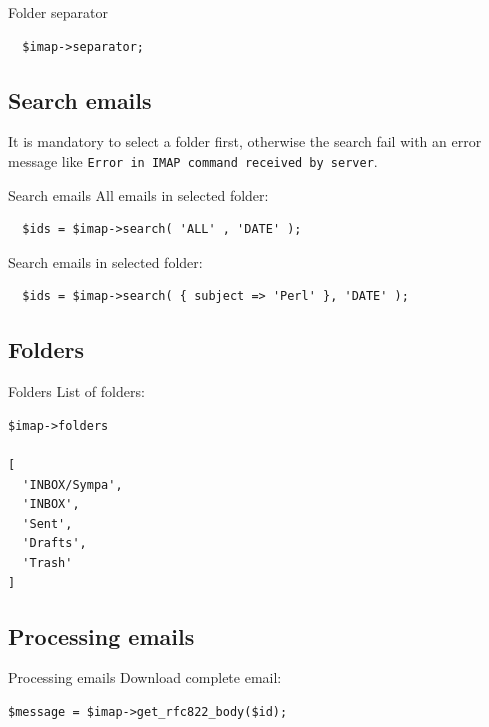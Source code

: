 \begin{frame}[fragile]{Folder separator}

\begin{verbatim}
  $imap->separator;
\end{verbatim}

\end{frame}

\subsection{Search emails}

It is mandatory to select a folder first, otherwise the search fail with an
error message like \verb|Error in IMAP command received by server|.

\begin{frame}[fragile]{Search emails}
  All emails in selected folder:

\begin{verbatim}
  $ids = $imap->search( 'ALL' , 'DATE' );
\end{verbatim}

  Search emails in selected folder:

\begin{verbatim}
  $ids = $imap->search( { subject => 'Perl' }, 'DATE' );
\end{verbatim}
\end{frame}

\subsection{Folders}

\begin{frame}[fragile]{Folders}
  List of folders:

\begin{verbatim}
$imap->folders

[
  'INBOX/Sympa',
  'INBOX',
  'Sent',
  'Drafts',
  'Trash'
]
\end{verbatim}
\end{frame}

\subsection{Processing emails}

\begin{frame}[fragile]{Processing emails}
  Download complete email:

\begin{verbatim}
$message = $imap->get_rfc822_body($id);
\end{verbatim}
\end{frame}

